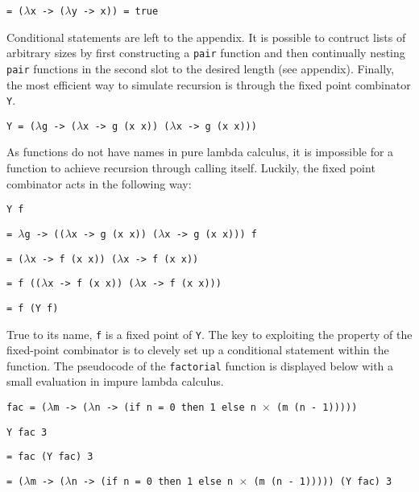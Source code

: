 \documentclass[11pt]{article}
\begin{document}
\hspace{2.5cm}\texttt{= ($\lambda$x -> ($\lambda$y -> x)) = true}


Conditional statements are left to the appendix. It is possible to contruct lists of arbitrary sizes by first constructing a \texttt{pair} function and then continually nesting \texttt{pair} functions in the second slot to the desired length (see appendix). Finally, the most efficient way to simulate recursion is through the fixed point combinator \texttt{Y}.

\hspace{2cm}\texttt{Y = ($\lambda$g -> ($\lambda$x -> g (x x)) ($\lambda$x -> g (x x)))}

As functions do not have names in pure lambda calculus, it is impossible for a function to achieve recursion through calling itself. Luckily, the fixed point combinator acts in the following way: 

\hspace{2cm}\texttt{Y f}

\hspace{2.5cm}\texttt{= $\lambda$g -> (($\lambda$x -> g (x x)) ($\lambda$x -> g (x x))) f}

\hspace{2.5cm}\texttt{= ($\lambda$x -> f (x x)) ($\lambda$x -> f (x x))}

\hspace{2.5cm}\texttt{= f (($\lambda$x -> f (x x)) ($\lambda$x -> f (x x)))}

\hspace{2.5cm}\texttt{= f (Y f)}

True to its name, \texttt{f} is a fixed point of \texttt{Y}. The key to exploiting the property of the fixed-point combinator is to clevely set up a conditional statement within the function. The pseudocode of the \texttt{factorial} function is displayed below with a small evaluation in impure lambda calculus.

\small
\hspace{2cm}\texttt{fac = ($\lambda$m -> ($\lambda$n -> (if n = 0 then 1 else n $\times$ (m (n - 1)))))}

\hspace{2cm}\texttt{Y fac 3}

\hspace{2.5cm}\texttt{= fac (Y fac) 3}

\hspace{2.5cm}\texttt{= ($\lambda$m -> ($\lambda$n -> (if n = 0 then 1 else n $\times$ (m (n - 1))))) (Y fac) 3}
\end{document}
